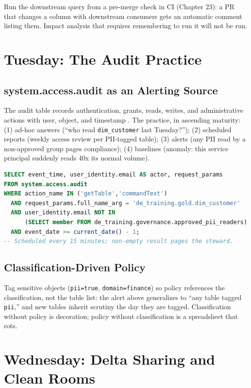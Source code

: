 \begin{tipbox}
Run the downstream query from a pre-merge check in CI (Chapter 23): a PR that changes a column with downstream consumers gets an automatic comment listing them. Impact analysis that requires remembering to run it will not be run.
\end{tipbox}

\section{Tuesday: The Audit Practice}
\subsection{system.access.audit as an Alerting Source}
The audit table records authentication, grants, reads, writes, and administrative actions with user, object, and timestamp \cite{databricksSystemTables}. The practice, in ascending maturity: (1) ad-hoc answers (``who read \texttt{dim\_customer} last Tuesday?''); (2) scheduled reports (weekly access review per PII-tagged table); (3) alerts (any PII read by a non-approved group pages compliance); (4) baselines (anomaly: this service principal suddenly reads 40x its normal volume).

\begin{lstlisting}[language=SQL,caption={The PII access alert query.},label={lst:ch22-audit-alert}]
SELECT event_time, user_identity.email AS actor, request_params
FROM system.access.audit
WHERE action_name IN ('getTable','commandText')
  AND request_params.full_name_arg = 'de_training.gold.dim_customer'
  AND user_identity.email NOT IN
      (SELECT member FROM de_training.governance.approved_pii_readers)
  AND event_date >= current_date() - 1;
-- Scheduled every 15 minutes; non-empty result pages the steward.
\end{lstlisting}

\subsection{Classification-Driven Policy}
Tag sensitive objects (\texttt{pii=true}, \texttt{domain=finance}) so policy references the classification, not the table list: the alert above generalizes to ``any table tagged \texttt{pii},'' and new tables inherit scrutiny the day they are tagged. Classification without policy is decoration; policy without classification is a spreadsheet that rots.

\section{Wednesday: Delta Sharing and Clean Rooms}
